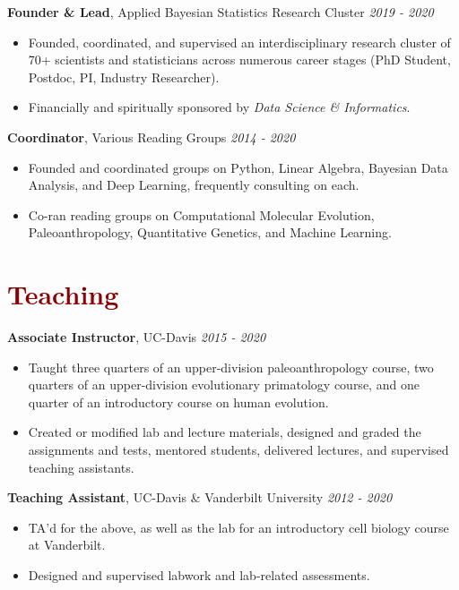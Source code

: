 \documentclass[11pt,margin,line]{resume}
\begin{document}
\begin{resume}
\textbf{Founder \& Lead}, Applied Bayesian Statistics Research Cluster \hfill \emph{2019 - 2020}
\begin{itemize}[noitemsep]
\item Founded, coordinated, and supervised an interdisciplinary research cluster of 70+ scientists and statisticians across numerous career stages (PhD Student, Postdoc, PI, Industry Researcher). \item Financially and spiritually sponsored by \emph{Data Science \& Informatics}.
\end{itemize} 
\vspace{-1.5mm}

\textbf{Coordinator}, Various Reading Groups \hfill \emph{2014 - 2020}
\begin{itemize}[noitemsep]
\item Founded and coordinated groups on Python, Linear Algebra, Bayesian Data Analysis, and Deep Learning, frequently consulting on each. 
\item Co-ran reading groups on Computational Molecular Evolution, Paleoanthropology, Quantitative Genetics, and Machine Learning.
\end{itemize} 
\vspace{-1.5mm}

\section{\large\textcolor{DarkRed}{Teaching}}

\textbf{Associate Instructor}, UC-Davis \hfill \emph{2015  - 2020}
\begin{itemize}[noitemsep]
\item Taught three quarters of an upper-division paleoanthropology course, two quarters of an upper-division evolutionary primatology course, and one quarter of an introductory course on human evolution. 
\item Created or modified lab and lecture materials, designed and graded the assignments and tests, mentored students, delivered lectures, and supervised teaching assistants.
\end{itemize} 
\vspace{-1.5mm}

\textbf{Teaching Assistant}, UC-Davis \& Vanderbilt University \hfill \emph{2012  - 2020}
\begin{itemize}[noitemsep]
\item TA'd for the above, as well as the lab for an introductory cell biology course at Vanderbilt. 
\item Designed and supervised labwork and lab-related assessments.
\end{itemize}
\vspace{-1.5mm}


\end{resume}
\end{document}
